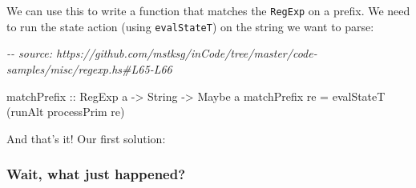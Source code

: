 \documentclass[]{article}
\newenvironment{Shaded}{}{}
\newcommand{\CommentTok}[1]{\textcolor[rgb]{0.38,0.63,0.69}{\textit{#1}}}
\newcommand{\DataTypeTok}[1]{\textcolor[rgb]{0.56,0.13,0.00}{#1}}
\newcommand{\DecValTok}[1]{\textcolor[rgb]{0.25,0.63,0.44}{#1}}
\newcommand{\FunctionTok}[1]{\textcolor[rgb]{0.02,0.16,0.49}{#1}}
\newcommand{\NormalTok}[1]{#1}
\newcommand{\OperatorTok}[1]{\textcolor[rgb]{0.40,0.40,0.40}{#1}}
\newcommand{\OtherTok}[1]{\textcolor[rgb]{0.00,0.44,0.13}{#1}}
\newcommand{\StringTok}[1]{\textcolor[rgb]{0.25,0.44,0.63}{#1}}
\begin{document}
We can use this to write a function that matches the \texttt{RegExp} on a
prefix. We need to run the state action (using \texttt{evalStateT}) on the
string we want to parse:

\begin{Shaded}
\begin{Highlighting}[]
\CommentTok{{-}{-} source: https://github.com/mstksg/inCode/tree/master/code{-}samples/misc/regexp.hs\#L65{-}L66}

\OtherTok{matchPrefix ::} \DataTypeTok{RegExp}\NormalTok{ a }\OtherTok{{-}>} \DataTypeTok{String} \OtherTok{{-}>} \DataTypeTok{Maybe}\NormalTok{ a}
\NormalTok{matchPrefix re }\OtherTok{=}\NormalTok{ evalStateT (runAlt processPrim re)}
\end{Highlighting}
\end{Shaded}

And that's it! Our first solution:

\begin{Shaded}
\end{Shaded}

\hypertarget{wait-what-just-happened}{%
\subsubsection{Wait, what just happened?}\label{wait-what-just-happened}}
\end{document}
